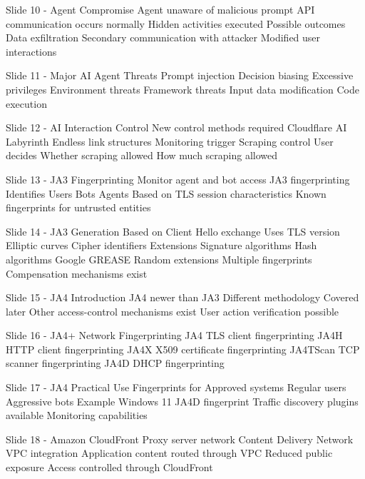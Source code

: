     Slide 10 - Agent Compromise
      Agent unaware of malicious prompt
      API communication occurs normally
      Hidden activities executed
      Possible outcomes
        Data exfiltration
        Secondary communication with attacker
        Modified user interactions

    Slide 11 - Major AI Agent Threats
      Prompt injection
      Decision biasing
      Excessive privileges
      Environment threats
      Framework threats
      Input data modification
      Code execution

    Slide 12 - AI Interaction Control
      New control methods required
      Cloudflare AI Labyrinth
      Endless link structures
      Monitoring trigger
      Scraping control
      User decides
        Whether scraping allowed
        How much scraping allowed

    Slide 13 - JA3 Fingerprinting
      Monitor agent and bot access
      JA3 fingerprinting
      Identifies
        Users
        Bots
        Agents
      Based on TLS session characteristics
      Known fingerprints for untrusted entities

    Slide 14 - JA3 Generation
      Based on Client Hello exchange
      Uses
        TLS version
        Elliptic curves
        Cipher identifiers
        Extensions
        Signature algorithms
        Hash algorithms
      Google GREASE
        Random extensions
        Multiple fingerprints
      Compensation mechanisms exist

    Slide 15 - JA4 Introduction
      JA4 newer than JA3
      Different methodology
      Covered later
      Other access-control mechanisms exist
      User action verification possible

    Slide 16 - JA4+ Network Fingerprinting
      JA4
        TLS client fingerprinting
      JA4H
        HTTP client fingerprinting
      JA4X
        X509 certificate fingerprinting
      JA4TScan
        TCP scanner fingerprinting
      JA4D
        DHCP fingerprinting

    Slide 17 - JA4 Practical Use
      Fingerprints for
        Approved systems
        Regular users
        Aggressive bots
      Example Windows 11 JA4D fingerprint
      Traffic discovery plugins available
      Monitoring capabilities

    Slide 18 - Amazon CloudFront
      Proxy server network
      Content Delivery Network
      VPC integration
      Application content routed through VPC
      Reduced public exposure
      Access controlled through CloudFront

